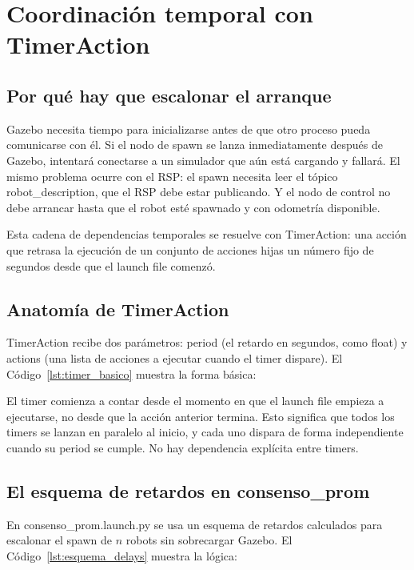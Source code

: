 \section{Coordinación temporal con TimerAction}

\subsection{Por qué hay que escalonar el arranque}

Gazebo necesita tiempo para inicializarse antes de que otro proceso pueda comunicarse con él. Si el nodo de spawn se lanza inmediatamente después de Gazebo, intentará conectarse a un simulador que aún está cargando y fallará. El mismo problema ocurre con el RSP: el spawn necesita leer el tópico robot\_description, que el RSP debe estar publicando. Y el nodo de control no debe arrancar hasta que el robot esté spawnado y con odometría disponible.

Esta cadena de dependencias temporales se resuelve con TimerAction: una acción que retrasa la ejecución de un conjunto de acciones hijas un número fijo de segundos desde que el launch file comenzó.

\subsection{Anatomía de TimerAction}

TimerAction recibe dos parámetros: period (el retardo en segundos, como float) y actions (una lista de acciones a ejecutar cuando el timer dispare). El Código~\ref{lst:timer_basico} muestra la forma básica:



El timer comienza a contar desde el momento en que el launch file empieza a ejecutarse, no desde que la acción anterior termina. Esto significa que todos los timers se lanzan en paralelo al inicio, y cada uno dispara de forma independiente cuando su period se cumple. No hay dependencia explícita entre timers.

\subsection{El esquema de retardos en consenso\_prom}

En consenso\_prom.launch.py se usa un esquema de retardos calculados para escalonar el spawn de $n$ robots sin sobrecargar Gazebo. El Código~\ref{lst:esquema_delays} muestra la lógica:

